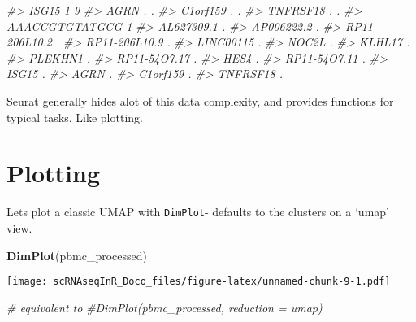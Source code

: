 \documentclass[
]{book}
\newenvironment{Shaded}{\begin{snugshade}}{\end{snugshade}}
\newcommand{\CommentTok}[1]{\textcolor[rgb]{0.56,0.35,0.01}{\textit{#1}}}
\newcommand{\FunctionTok}[1]{\textcolor[rgb]{0.13,0.29,0.53}{\textbf{#1}}}
\newcommand{\NormalTok}[1]{#1}
\begin{document}
\begin{Shaded}
\begin{Highlighting}[]
\CommentTok{\#\textgreater{} ISG15                        1                9}
\CommentTok{\#\textgreater{} AGRN                         .                .}
\CommentTok{\#\textgreater{} C1orf159                     .                .}
\CommentTok{\#\textgreater{} TNFRSF18                     .                .}
\CommentTok{\#\textgreater{}               AAACCGTGTATGCG{-}1}
\CommentTok{\#\textgreater{} AL627309.1                   .}
\CommentTok{\#\textgreater{} AP006222.2                   .}
\CommentTok{\#\textgreater{} RP11{-}206L10.2                .}
\CommentTok{\#\textgreater{} RP11{-}206L10.9                .}
\CommentTok{\#\textgreater{} LINC00115                    .}
\CommentTok{\#\textgreater{} NOC2L                        .}
\CommentTok{\#\textgreater{} KLHL17                       .}
\CommentTok{\#\textgreater{} PLEKHN1                      .}
\CommentTok{\#\textgreater{} RP11{-}54O7.17                 .}
\CommentTok{\#\textgreater{} HES4                         .}
\CommentTok{\#\textgreater{} RP11{-}54O7.11                 .}
\CommentTok{\#\textgreater{} ISG15                        .}
\CommentTok{\#\textgreater{} AGRN                         .}
\CommentTok{\#\textgreater{} C1orf159                     .}
\CommentTok{\#\textgreater{} TNFRSF18                     .}
\end{Highlighting}
\end{Shaded}

Seurat generally hides alot of this data complexity, and provides functions for typical tasks. Like plotting.

\hypertarget{plotting}{%
\section{Plotting}\label{plotting}}

Lets plot a classic UMAP with \texttt{DimPlot}- defaults to the clusters on a `umap' view.

\begin{Shaded}
\begin{Highlighting}[]
\FunctionTok{DimPlot}\NormalTok{(pbmc\_processed)}
\end{Highlighting}
\end{Shaded}

\texttt{[image: scRNAseqInR\_Doco\_files/figure-latex/unnamed-chunk-9-1.pdf]}

\begin{Shaded}
\begin{Highlighting}[]
\CommentTok{\# equivalent to}
\CommentTok{\#DimPlot(pbmc\_processed, reduction = \textquotesingle{}umap\textquotesingle{})}
\end{Highlighting}
\end{Shaded}
\end{document}
